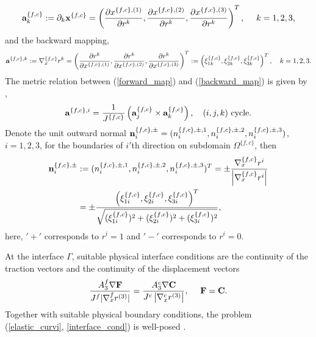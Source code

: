 \begin{equation}\label{forward_map}
{\bf a}_k^{\{f,c\}} := \partial_k{\bf x}^{\{f,c\}}  = \left(\frac{\partial x^{\{f,c\},(1)}}{\partial r^{k}},\frac{\partial x^{\{f,c\},(2)}}{\partial r^{k}},\frac{\partial x^{\{f,c\},(3)}}{\partial r^{k}}\right)^T,\ \ \ \ k = 1,2,3,
\end{equation}
and the backward mapping,
\begin{equation}\label{backward_map}
{\bf a}^{\{f,c\},k} := \nabla_x^{\{f,c\}} r^{k} = \left(\frac{\partial r^{k}}{\partial x^{\{f,c\},(1)}},\frac{\partial r^{k}}{\partial x^{\{f,c\},(2)}},\frac{\partial r^{k}}{\partial x^{\{f,c\},(3)}}\right)^T := \left(\xi_{1k}^{\{f,c\}},\xi_{2k}^{\{f,c\}},\xi_{3k}^{\{f,c\}}\right)^T,\ \ \ k = 1,2,3.
\end{equation}
 The metric relation between (\ref{forward_map}) and (\ref{backward_map}) is given by \cite{thompson1985numerical},
\begin{equation*}
{\bf a}^{\{f,c\},i} = \frac{1}{J^{\{f,c\}}}\left({\bf a}_j^{\{f,c\}}\times{\bf a}_k^{\{f,c\}}\right), \ \ \ (i,j,k) \ \mbox{cycle}.
\end{equation*}
Denote the unit outward normal ${\bf n}_i^{\{f,c\},\pm} = (n_i^{\{f,c\},\pm,1},n_i^{\{f,c\},\pm,2},n_i^{\{f,c\},\pm,3})$, $i = 1,2,3$, for the boundaries of $i'$th direction on subdomain $\Omega^{\{f,c\}}$, then
\begin{align}\label{outward_normal}
{\bf n}_i^{\{f,c\},\pm} &:= (n^{\{f,c\},\pm,1}_i,n^{\{f,c\},\pm,2}_i,n^{\{f,c\},\pm,3}_i)^T = \pm \frac{\nabla_x^{\{f,c\}} r^{i}}{\left|\nabla_x^{\{f,c\}} r^{i}\right|} \nonumber\\
&= \pm\frac{ \left(\xi_{1i}^{\{f,c\}},\xi_{2i}^{\{f,c\}},\xi_{3i}^{\{f,c\}}\right)^T}{\sqrt{(\xi_{1i}^{\{f,c\}})^2+(\xi_{2i}^{\{f,c\}})^2+(\xi_{3i}^{\{f,c\}})^2}},
\end{align}
here, $'+'$ corresponds to $r^{i} = 1$ and $'-'$ corresponds to $r^{i} = 0$.  

At the interface $\Gamma$, suitable physical interface conditions are the continuity of the traction vectors and the continuity of the displacement vectors 
\begin{equation}\label{interface_cond}
\frac{A_3^f\nabla{\bf F}}{J^f|\nabla_x^f r^{(3)}|}  = \frac{A_3^c\nabla{\bf C}}{J^c\left|\nabla_x^c r^{(3)}\right|}, \ \ \ \ {\bf F} = {\bf C}.
\end{equation}
Together with suitable physical boundary conditions, the problem (\ref{elastic_curvi}, \ref{interface_cond}) is well-posed \cite{duru2014stable, petersson2015wave}.


